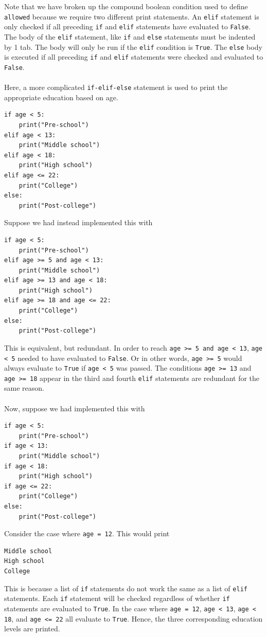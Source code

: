 \documentclass{article}
\begin{document}
Note that we have broken up the compound boolean condition used to define \texttt{allowed} because we require two different print statements. An \texttt{elif} statement is only checked if all preceding \texttt{if} and \texttt{elif} statements have evaluated to \texttt{\texttt{False}}. The body of the \texttt{elif} statement, like \texttt{if} and \texttt{else} statements must be indented by 1 tab. The body will only be run if the \texttt{elif} condition is \texttt{True}. The \texttt{else} body is executed if all preceding \texttt{if} and \texttt{elif} statements were checked and evaluated to \texttt{\texttt{False}}.\\\\
Here, a more complicated \texttt{if-elif-else} statement is used to print the appropriate education based on age.
\begin{verbatim}
if age < 5:
    print("Pre-school")
elif age < 13:
    print("Middle school")
elif age < 18:
    print("High school")
elif age <= 22:
    print("College")
else:
    print("Post-college")
\end{verbatim}
Suppose we had instead implemented this with
\begin{verbatim}
if age < 5:
    print("Pre-school")
elif age >= 5 and age < 13:
    print("Middle school")
elif age >= 13 and age < 18:
    print("High school")
elif age >= 18 and age <= 22:
    print("College")
else:
    print("Post-college")
\end{verbatim}
This is equivalent, but redundant. In order to reach \texttt{age >= 5 and age < 13}, \texttt{age < 5} needed to have evaluated to \texttt{\texttt{False}}. Or in other words, \texttt{age >= 5} would always evaluate to \texttt{True} if \texttt{age < 5} was passed. The conditions \texttt{age >= 13} and \texttt{age >= 18} appear in the third and fourth \texttt{elif} statements are redundant for the same reason.\\\\
Now, suppose we had implemented this with 
\begin{verbatim}
if age < 5:
    print("Pre-school")
if age < 13:
    print("Middle school")
if age < 18:
    print("High school")
if age <= 22:
    print("College")
else:
    print("Post-college")
\end{verbatim}
Consider the case where \texttt{age = 12}. This would print
\begin{verbatim}
Middle school
High school
College
\end{verbatim}
This is because a list of \texttt{if} statements do not work the same as a list of \texttt{elif} statements. Each \texttt{if} statement will be checked regardless of whether \texttt{if} statements are evaluated to \texttt{True}. In the case where \texttt{age = 12}, \texttt{age < 13}, \texttt{age < 18}, and \texttt{age <= 22} all evaluate to \texttt{True}. Hence, the three corresponding education levels are printed.
\end{document}

